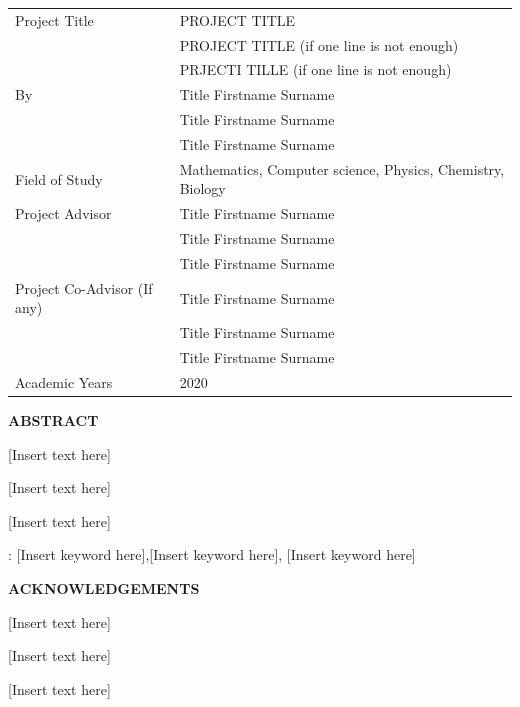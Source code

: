 \documentclass[12pt,a4paper,oneside]{book}
\theoremstyle{plain}
\numberwithin{equation}{chapter} \DeclareMathOperator{\Var}{Var}
\begin{document}
\newpage
{}
\begin{table}[h]
	\begin{tabular}{ll}
		Project Title								   & PROJECT TITLE  \\
										 					&PROJECT TITLE (if one line is not enough) \\
										 					& PRJECTI TILLE (if one line is not enough) \\
		By							   					  & Title Firstname Surname \\
															& Title Firstname Surname \\
															& Title Firstname Surname \\
		Field of Study			  					 & Mathematics, Computer science, Physics, Chemistry,
Biology
\\
		Project Advisor								& Title Firstname Surname \\
															& Title Firstname Surname \\
															& Title Firstname Surname \\
		Project Co-Advisor (If any)			  & Title Firstname Surname \\
															& Title Firstname Surname \\
															& Title Firstname Surname \\
		Academic Years							  & 2020 \\
	\end{tabular}
\end{table}
\begin{center}
  \large{\textbf{ABSTRACT}}\\
\end{center}

[Insert text here]

[Insert text here]

[Insert text here]

 : [Insert keyword here],[Insert keyword here], [Insert keyword here]

\newpage
\begin{center}
	\large{\textbf{ACKNOWLEDGEMENTS}} \\
\end{center}

[Insert text here]

[Insert text here]

[Insert text here]\\\\
\end{document}
